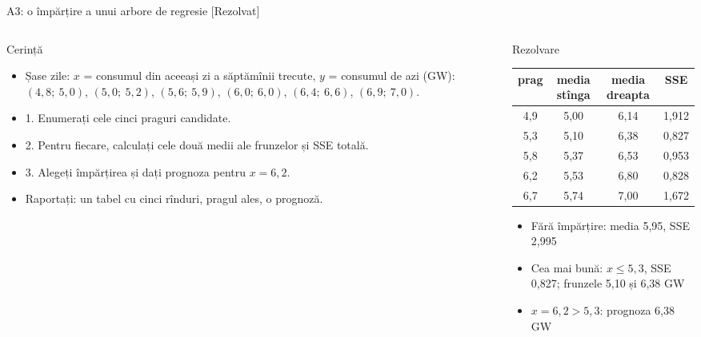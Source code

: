 \begin{frame}{A3: o împărțire a unui arbore de regresie [Rezolvat]}
\itemsize{\scriptsize}
\begin{columns}[T]
\begin{column}{0.47\textwidth}
\begin{block}{Cerință}
\begin{itemize}
    \item Șase zile: $x$ = consumul din aceeași zi a săptămînii trecute, $y$ = consumul de azi (GW): $(4{,}8;\ 5{,}0)$, $(5{,}0;\ 5{,}2)$, $(5{,}6;\ 5{,}9)$, $(6{,}0;\ 6{,}0)$, $(6{,}4;\ 6{,}6)$, $(6{,}9;\ 7{,}0)$.
    \item 1. Enumerați cele cinci praguri candidate.
    \item 2. Pentru fiecare, calculați cele două medii ale frunzelor și SSE totală.
    \item 3. Alegeți împărțirea și dați prognoza pentru $x = 6{,}2$.
    \item Raportați: un tabel cu cinci rînduri, pragul ales, o prognoză.
\end{itemize}
\end{block}
\end{column}
\begin{column}{0.49\textwidth}
\begin{exampleblock}{Rezolvare}
\begin{center}
\scriptsize
\begin{tabular}{cccc}
\toprule
prag & media stînga & media dreapta & SSE \\
\midrule
4{,}9 & 5{,}00 & 6{,}14 & 1{,}912 \\
5{,}3 & 5{,}10 & 6{,}38 & 0{,}827 \\
5{,}8 & 5{,}37 & 6{,}53 & 0{,}953 \\
6{,}2 & 5{,}53 & 6{,}80 & 0{,}828 \\
6{,}7 & 5{,}74 & 7{,}00 & 1{,}672 \\
\bottomrule
\end{tabular}
\end{center}
\begin{itemize}
    \item Fără împărțire: media 5{,}95, SSE 2{,}995
    \item Cea mai bună: $x \le 5{,}3$, SSE 0{,}827; frunzele 5{,}10 și 6{,}38 GW
    \item $x = 6{,}2 > 5{,}3$: prognoza 6{,}38 GW
\end{itemize}
\end{exampleblock}
\end{column}
\end{columns}
\end{frame}

